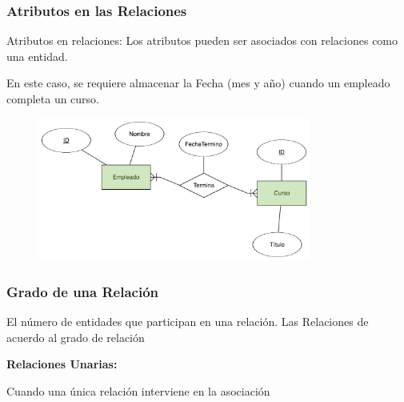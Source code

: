 \documentclass[12pt, fleqn]{report}                             %
\begin{document}
            \clearpage
            \subsubsection{Atributos en las Relaciones}

                Atributos en relaciones: Los atributos pueden ser asociados con relaciones
                como una entidad.

                En este caso, se requiere almacenar la Fecha (mes y año) cuando un empleado
                completa un curso.


                \begin{figure}[h]
                    \centering
                    \includegraphics[width=0.80\textwidth]{RelacionConAtributos}
                \end{figure}

            \subsubsection{Grado de una Relación}

                El número de entidades que participan en una relación.
                Las Relaciones de acuerdo al grado de relación

                \textbf{Relaciones Unarias: }

                    Cuando una única relación interviene en la asociación
\end{document}
